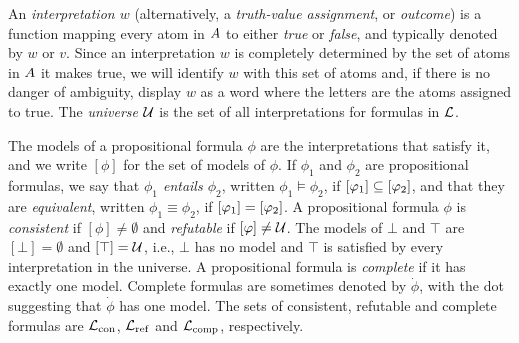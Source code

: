 An \emph{interpretation $w$} 
(alternatively, a \emph{truth-value assignment}, or \emph{outcome}) 
is a function mapping every atom in $A$ to either \emph{true} or \emph{false},
and typically denoted by $w$ or $v$.
Since an interpretation $w$ is completely determined 
by the set of atoms in $A$ it makes true,
we will identify $w$ with this set of atoms
and, if there is no danger of ambiguity, display $w$ 
as a word where the letters are the atoms assigned to true.
The \emph{universe $\mathcal{U}$} is the set of all interpretations 
for formulas in $\mathcal{L}$.

The models of a propositional formula $\phi$ are the interpretations that satisfy it,
and we write $[\phi]$ for the set of models of $\phi$.
If $\phi_1$ and $\phi_2$ are propositional formulas,
we say that \emph{$\phi_1$ entails $\phi_2$}, 
written $\phi_1 \models \phi_2$, if $[\varphi_1]\subseteq[\varphi_2]$,
and that they are \emph{equivalent}, written $\phi_1 \equiv \phi_2$, if $[\varphi_1]= [\varphi_2]$.
A propositional formula $\phi$ is \emph{consistent} if $[\phi]\neq\emptyset$
and \emph{refutable} if $[\varphi]\neq\mathcal{U}$.
The models of $\bot$ and $\top$ are $[\bot]=\emptyset$ and $[\top]=\mathcal{U}$,
i.e., $\bot$ has no model and $\top$ is satisfied by every interpretation in the universe.
A propositional formula is \emph{complete} if it has exactly one model.
Complete formulas are sometimes denoted by $\dot{\phi}$, with the dot suggesting that 
$\dot{\phi}$ has one model.
The sets of consistent, refutable and complete formulas are $\mathcal{L}_{\operatorname{con}}$, $\mathcal{L}_{\operatorname{ref}}$ and $\mathcal{L}_{\operatorname{comp}}$, respectively.

